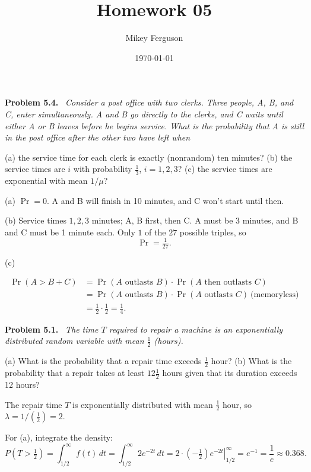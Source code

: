 \documentclass[11pt]{article}
\title{Homework 05}
\author{Mikey Ferguson}
\date{\today}
\newenvironment{problem}[1]
  {\par\medskip\noindent\textbf{Problem #1.}\ \itshape}
  {\par\medskip}
\begin{document}
\maketitle


\begin{problem}{5.4}
Consider a post office with two clerks. Three people, A, B, and C, enter simultaneously. A and B go directly to the clerks, and C waits until either A or B leaves before he begins service. What is the probability that A is still in the post office after the other two have left when

(a) the service time for each clerk is exactly (nonrandom) ten minutes?
(b) the service times are $i$ with probability $\tfrac13$, $i=1,2,3$?
(c) the service times are exponential with mean $1/\mu$?
\end{problem}
(a) $\Pr = 0$. A and B will finish in 10 minutes, and C won't start until then.

(b) Service times $1,2,3$ minutes; A, B first, then C. A must be 3 minutes, and B and C must be 1 minute each. Only $1$ of the $27$ possible triples, so
$$\boxed{\Pr=\tfrac{1}{27}}.$$


(c)

$$\begin{aligned}
\Pr(A > B+C) &= \Pr(A\text{ outlasts }B)\cdot\Pr(A\text{ then outlasts }C)\\
&= \Pr(A\text{ outlasts }B)\cdot\Pr(A\text{ outlasts }C)\ \text{(memoryless)}\\
&= \tfrac12\cdot\tfrac12 = \tfrac14.
\end{aligned}$$

\begin{problem}{5.1}
The time $T$ required to repair a machine is an exponentially distributed random variable with mean $\tfrac12$ (hours).

(a) What is the probability that a repair time exceeds $\tfrac12$ hour?
(b) What is the probability that a repair takes at least $12\tfrac12$ hours given that its duration exceeds 12 hours?
\end{problem}
The repair time $T$ is exponentially distributed with mean $\tfrac12$ hour, so $\lambda = 1/(\tfrac12) = 2$.

For (a), integrate the density:
$$P(T > \tfrac12) = \int_{1/2}^{\infty} f(t)\,dt = \int_{1/2}^{\infty} 2e^{-2t}\,dt = \left. 2\cdot(-\tfrac12)e^{-2t} \right|_{1/2}^{\infty} = e^{-1} = \frac{1}{e} \approx 0.368.$$
\end{document}
